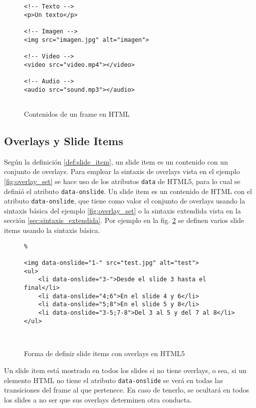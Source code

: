 				\begin{figure}[htb]%

					\begin{lstlisting}						
<!-- Texto -->
<p>Un texto</p>

<!-- Imagen -->
<img src="imagen.jpg" alt="imagen">

<!-- Video -->
<video src="video.mp4"></video>

<!-- Audio -->
<audio src="sound.mp3"></audio>		 							 					
 					 			

					\end{lstlisting}
					\caption{Contenidos de un frame en HTML}
					\label{fig:frames_html_content}
				\end{figure}	  
		


		\subsection{Overlays y Slide Items} %
		\label{sub:slide_items}
			Según la definición \ref{def:slide_item}, un slide item es un contenido con un conjunto de overlays. Para emplear la sintaxis de overlays vista en el ejemplo \ref{fig:overlay_set} se hace uso de los atributos \texttt{data} de HTML5, para lo cual se definió el atributo \texttt{data-onslide}. Un slide item es un contenido de HTML con el atributo \texttt{data-onslide}, que tiene como valor el conjunto de overlays usando la sintaxis básica del ejemplo \ref{fig:overlay_set} o la sintaxis extendida vista en la sección \ref{sec:sintaxis_extendida}. Por ejemplo en la fig. \ref{fig:slide_items_html} se definen varios slide items usando la sintaxis básica.


				\begin{figure}[htb]%
					\begin{lstlisting}%

<img data-onslide="1-" src="test.jpg" alt="test">
<ul>
    <li data-onslide="3-">Desde el slide 3 hasta el final</li>
    <li data-onslide="4;6">En el slide 4 y 6</li>
    <li data-onslide="5;8">En el slide 5 y 8</li>
    <li data-onslide="3-5;7-8">Del 3 al 5 y del 7 al 8</li>
</ul> 

	
					\end{lstlisting}
					\caption{Forma de definir slide items con overlays en HTML5}
					\label{fig:slide_items_html}
				\end{figure}
			Un slide item está mostrado en todos los slides si no tiene overlays, o sea, si un elemento HTML no tiene el atributo \texttt{data-onslide} se verá en todas las transiciones del frame al que pertenece. En caso de tenerlo, se ocultará en todos los slides a no ser que sus overlays determinen otra conducta.


